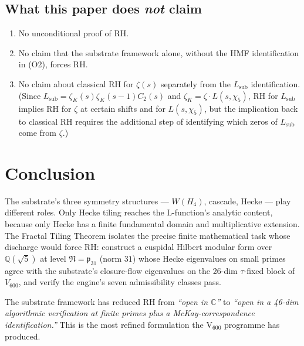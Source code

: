 \documentclass[11pt,a4paper]{article}
\theoremstyle{definition}
\newcommand{\Q}{\mathbb{Q}}
\newcommand{\C}{\mathbb{C}}
\newcommand{\sub}{\mathrm{sub}}
\begin{document}
\subsection{What this paper does \emph{not} claim}
\begin{enumerate}
\item No unconditional proof of RH.
\item No claim that the substrate framework alone, without the HMF identification
      in (O2), forces RH.
\item No claim about classical RH for $\zeta(s)$ separately from the
      $L_\sub$ identification. (Since $L_\sub = \zeta_K(s)\zeta_K(s-1)C_2(s)$
      and $\zeta_K = \zeta\cdot L(s,\chi_5)$, RH for $L_\sub$ implies RH for
      $\zeta$ at certain shifts and for $L(s,\chi_5)$, but the implication
      back to classical RH requires the additional step of identifying which
      zeros of $L_\sub$ come from $\zeta$.)
\end{enumerate}

\section{Conclusion}

The substrate's three symmetry structures --- $W(H_4)$, cascade, Hecke ---
play different roles. Only Hecke tiling reaches the L-function's analytic
content, because only Hecke has a finite fundamental domain and multiplicative
extension. The Fractal Tiling Theorem isolates the precise finite mathematical
task whose discharge would force RH: construct a cuspidal Hilbert modular
form over $\Q(\sqrt{5})$ at level $\mathfrak{N}=\mathfrak{p}_{31}$ (norm $31$) whose
Hecke eigenvalues on small primes agree with the substrate's closure-flow
eigenvalues on the 26-dim $\tau$-fixed block of $V_{600}$, and verify the
engine's seven admissibility classes pass.

The substrate framework has reduced RH from \emph{``open in $\C$''} to
\emph{``open in a 46-dim algorithmic verification at finite primes plus a
McKay-correspondence identification.''} This is the most refined formulation
the V$_{600}$ programme has produced.
\end{document}
